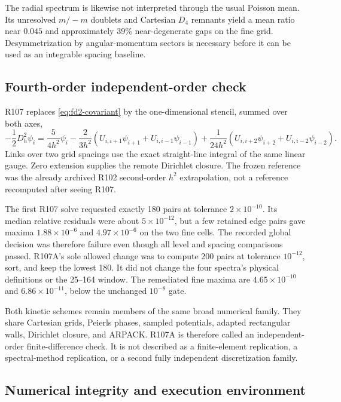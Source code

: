 The radial spectrum is likewise not interpreted through the usual Poisson
mean.  Its unresolved \(m/-m\) doublets and Cartesian \(D_4\) remnants yield
a mean ratio near \(0.045\) and approximately 39\% near-degenerate gaps on
the fine grid.  Desymmetrization by angular-momentum sectors is necessary
before it can be used as an integrable spacing baseline.

\subsection{Fourth-order independent-order check}

R107 replaces \cref{eq:fd2-covariant} by the one-dimensional stencil,
summed over both axes,
\begin{equation}
 -\frac12D_h^2\psi_i
 =\frac{5}{4h^2}\psi_i
 -\frac{2}{3h^2}
  \left(U_{i,i+1}\psi_{i+1}+U_{i,i-1}\psi_{i-1}\right)
 +\frac{1}{24h^2}
  \left(U_{i,i+2}\psi_{i+2}+U_{i,i-2}\psi_{i-2}\right).
 \label{eq:fd4-covariant}
\end{equation}
Links over two grid spacings use the exact straight-line integral of the same
linear gauge.  Zero extension supplies the remote Dirichlet closure.  The
frozen reference was the already archived R102 second-order \(h^2\)
extrapolation, not a reference recomputed after seeing R107.

The first R107 solve requested exactly 180 pairs at tolerance
\(2\times10^{-10}\).  Its median relative residuals were about
\(5\times10^{-12}\), but a few retained edge pairs gave maxima
\(1.88\times10^{-6}\) and \(4.97\times10^{-6}\) on the two fine cells.
The recorded global decision was therefore failure even though all level and
spacing comparisons passed.  R107A's sole allowed change was to compute 200
pairs at tolerance \(10^{-12}\), sort, and keep the lowest 180.  It did not
change the four spectra's physical definitions or the 25--164 window.  The
remediated fine maxima are \(4.65\times10^{-10}\) and
\(6.86\times10^{-11}\), below the unchanged \(10^{-8}\) gate.

Both kinetic schemes remain members of the same broad numerical family.
They share Cartesian grids, Peierls phases, sampled potentials, adapted
rectangular walls, Dirichlet closure, and ARPACK.  R107A is therefore called
an independent-order finite-difference check.  It is not described as a
finite-element replication, a spectral-method replication, or a second
fully independent discretization family.

\subsection{Numerical integrity and execution environment}

